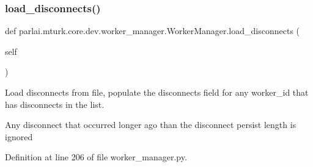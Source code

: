 \mbox{\label{classparlai_1_1mturk_1_1core_1_1dev_1_1worker__manager_1_1WorkerManager_a1d1185d97ee3a467a33a1872a316ea2d}} 
\subsubsection{\texorpdfstring{load\+\_\+disconnects()}{load\_disconnects()}}
{\footnotesize\ttfamily def parlai.\+mturk.\+core.\+dev.\+worker\+\_\+manager.\+Worker\+Manager.\+load\+\_\+disconnects (\begin{DoxyParamCaption}\item[{}]{self }\end{DoxyParamCaption})}

\begin{DoxyVerb}Load disconnects from file, populate the disconnects field for any worker_id
that has disconnects in the list.

Any disconnect that occurred longer ago than the disconnect persist length is
ignored
\end{DoxyVerb}
 

Definition at line 206 of file worker\+\_\+manager.\+py.


